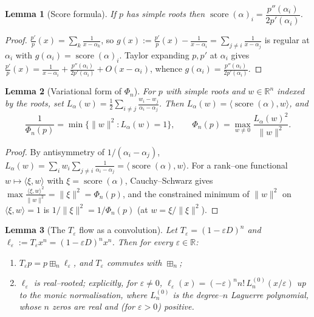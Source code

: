 \documentclass[12pt]{article}
\newtheorem{lemma}{Lemma}
\theoremstyle{definition}
\DeclareMathOperator{\score}{score}
\newcommand{\bR}{\mathbb{R}}
\newcommand{\boxp}{\boxplus_n}
\begin{document}
\begin{lemma}[Score formula]\label{lem:scoreformula}
If $p$ has simple roots then $\score(\alpha)_i=\dfrac{p''(\alpha_i)}{2p'(\alpha_i)}$.
\end{lemma}

\begin{proof}
$\frac{p'}{p}(x)=\sum_k\frac1{x-\alpha_k}$, so
$g(x):=\frac{p'}{p}(x)-\frac1{x-\alpha_i}=\sum_{j\ne i}\frac1{x-\alpha_j}$ is regular at
$\alpha_i$ with $g(\alpha_i)=\score(\alpha)_i$. Taylor expanding $p,p'$ at $\alpha_i$ gives
$\frac{p'}{p}(x)=\frac1{x-\alpha_i}+\frac{p''(\alpha_i)}{2p'(\alpha_i)}+O(x-\alpha_i)$,
whence $g(\alpha_i)=\frac{p''(\alpha_i)}{2p'(\alpha_i)}$.
\end{proof}

\begin{lemma}[Variational form of $\Phi_n$]\label{lem:variational}
For $p$ with simple roots and $w\in\bR^n$ indexed by the roots, set
$L_\alpha(w)=\tfrac12\sum_{i\ne j}\frac{w_i-w_j}{\alpha_i-\alpha_j}$. Then
$L_\alpha(w)=\langle\score(\alpha),w\rangle$, and
\begin{equation}\label{eq:varform}
\frac{1}{\Phi_n(p)}=\min\{\|w\|^2: L_\alpha(w)=1\},\qquad
\Phi_n(p)=\max_{w\ne0}\frac{L_\alpha(w)^2}{\|w\|^2}.
\end{equation}
\end{lemma}

\begin{proof}
By antisymmetry of $1/(\alpha_i-\alpha_j)$,
$L_\alpha(w)=\sum_i w_i\sum_{j\ne i}\frac1{\alpha_i-\alpha_j}=\langle\score(\alpha),w\rangle$.
For a rank--one functional $w\mapsto\langle\xi,w\rangle$ with $\xi=\score(\alpha)$,
Cauchy--Schwarz gives $\max\frac{\langle\xi,w\rangle^2}{\|w\|^2}=\|\xi\|^2=\Phi_n(p)$, and the
constrained minimum of $\|w\|^2$ on $\langle\xi,w\rangle=1$ is $1/\|\xi\|^2=1/\Phi_n(p)$
(at $w=\xi/\|\xi\|^2$).
\end{proof}

\begin{lemma}[The $T_\varepsilon$ flow as a convolution]\label{lem:Teps}
Let $T_\varepsilon=(1-\varepsilon D)^n$ and $\ell_\varepsilon:=T_\varepsilon x^n
=(1-\varepsilon D)^n x^n$. Then for every $\varepsilon\in\bR$:
\begin{enumerate}
\item[\textup{(a)}] $T_\varepsilon p = p\boxp \ell_\varepsilon$, and $T_\varepsilon$ commutes
with $\boxp$;
\item[\textup{(b)}] $\ell_\varepsilon$ is real--rooted; explicitly, for $\varepsilon\ne0$,
$\ell_\varepsilon(x)=(-\varepsilon)^n n!\,L_n^{(0)}(x/\varepsilon)$ up to the monic
normalisation, where $L_n^{(0)}$ is the degree--$n$ Laguerre polynomial, whose $n$ zeros are
real and (for $\varepsilon>0$) positive.
\end{enumerate}
\end{lemma}
\end{document}
